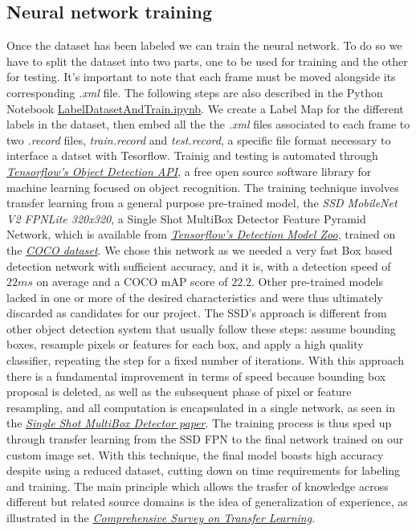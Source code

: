 \documentclass[a4paper, 12pt]{article}
\begin{document}
\subsection{Neural network training}
\label{NeuralNetworkTraining}
Once the dataset has been labeled we can train the neural network.
To do so we have to split the dataset into two parts, one to be used for training and the other for testing. It's important to note that each frame must be moved alongside its corresponding \textit{.xml} file.\linebreak
The following steps are also described in the Python Notebook \href{https://github.com/MarzioVallero/Real-time-Sign-Language-Detection/blob/master/LabelDatasetAndTrain.ipynb}{LabelDatasetAndTrain.ipynb}.\linebreak
We create a Label Map for the different labels in the dataset, then embed all the the \textit{.xml} files associated to each frame to two \textit{.record} files, \textit{train.record} and \textit{test.record}, a specific file format necessary to interface a datset with Tesorflow. \linebreak
Trainig and testing is automated through \textit{\hyperref[Ref9]{Tensorflow's Object Detection API}}, a free open source software library for machine learning focused on object recognition.\linebreak
The training technique involves transfer learning from a general purpose pre-trained model, the \textit{SSD MobileNet V2 FPNLite 320x320}, a Single Shot MultiBox Detector Feature Pyramid Network, which is available from \textit{\hyperref[Ref10]{Tensorflow's Detection Model Zoo}}, trained on the \textit{\hyperref[Ref2]{COCO dataset}}. We chose this network as we needed a very fast Box based detection network with sufficient accuracy, and it is, with a detection speed of $22 ms$ on average and a COCO mAP score of $22.2$.
Other pre-trained models lacked in one or more of the desired characteristics and were thus ultimately discarded as candidates for our project.\linebreak
The SSD's approach is different from other object detection system that usually follow these steps: assume bounding boxes, resample pixels or features for each box, and apply a high quality classifier, repeating the step for a fixed number of iterations. With this approach there is a fundamental improvement in terms of speed because bounding box proposal is deleted, as well as the subsequent phase of pixel or feature resampling, and all computation is encapsulated in a single network, as seen in the \textit{\hyperref[Ref1]{Single Shot MultiBox Detector paper}}.     
The training process is thus sped up through transfer learning from the SSD FPN to the final network trained on our custom image set. With this technique, the final model boasts high accuracy despite using a reduced dataset, cutting down on time requirements for labeling and training. The main principle which allows the trasfer of knowledge across different but related source domains is the idea of generalization of experience, as illustrated in the \textit{\hyperref[Ref3]{Comprehensive Survey on Transfer Learning}}.
\end{document}
